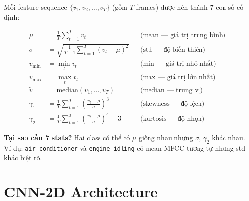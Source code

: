 \documentclass[12pt,a4paper]{article}
\begin{document}
Mỗi feature sequence $\{v_1, v_2, \ldots, v_T\}$ (gồm $T$ frames) được nén thành 7 con số cố định:

\begin{align}
    \mu &= \frac{1}{T}\sum_{t=1}^{T} v_t & & \text{(mean — giá trị trung bình)} \\[4pt]
    \sigma &= \sqrt{\frac{1}{T-1}\sum_{t=1}^{T}(v_t - \mu)^2} & & \text{(std — độ biến thiên)} \\[4pt]
    v_\text{min} &= \min_{t} v_t & & \text{(min — giá trị nhỏ nhất)} \\[4pt]
    v_\text{max} &= \max_{t} v_t & & \text{(max — giá trị lớn nhất)} \\[4pt]
    \tilde{v} &= \text{median}(v_1, \ldots, v_T) & & \text{(median — trung vị)} \\[4pt]
    \gamma_1 &= \frac{1}{T}\sum_{t=1}^{T}\!\left(\frac{v_t - \mu}{\sigma}\right)^{\!3} & & \text{(skewness — độ lệch)} \\[4pt]
    \gamma_2 &= \frac{1}{T}\sum_{t=1}^{T}\!\left(\frac{v_t - \mu}{\sigma}\right)^{\!4} - 3 & & \text{(kurtosis — độ nhọn)}
\end{align}

\textbf{Tại sao cần 7 stats?} Hai class có thể có $\mu$ giống nhau nhưng $\sigma$, $\gamma_2$ khác nhau. Ví dụ: \texttt{air\_conditioner} và \texttt{engine\_idling} có mean MFCC tương tự nhưng std khác biệt rõ.


\section{CNN-2D Architecture}
\end{document}
